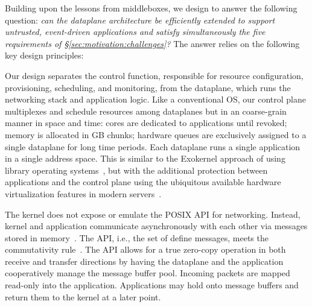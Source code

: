
Building upon the lessons from middleboxes, we design \ix to answer
the following question: {\it can the dataplane architecture be
  efficiently extended to support untrusted, event-driven applications
  and satisfy simultaneously the five requirements of
  \S\ref{sec:motivation:challenges}?}  The answer relies on the
following key design principles:


Our design separates the control function, responsible for resource
configuration, provisioning, scheduling, and monitoring, from the
dataplane, which runs the networking stack and application logic.
Like a conventional OS, our control plane multiplexes and schedule
resources among dataplanes but in an coarse-grain manner in space and
time: cores are dedicated to applications until revoked; memory is allocated in GB chunks; hardware
queues are exclusively assigned to a single dataplane for long time
periods. Each dataplane runs a single application in a single address
space.  This is similar to the Exokernel approach of using library
operating systems~\cite{DBLP:conf/sosp/EnglerKO95}, but with the
additional protection between applications and the control plane using
the ubiquitous available hardware virtualization features in modern
servers~\cite{DBLP:journals/computer/UhligNRSMABKLS05,belay2012dune}.


 The kernel does
not expose or emulate the POSIX API for networking.  Instead, kernel
and application communicate asynchronously with each other via
messages stored in memory~\cite{rizzo2012netmap,han2012megapipe}.  The
API, i.e., the set of define messages, meets the commutativity rule~\cite{DBLP:conf/sosp/ClementsKZMK13}.
The API allows for a true zero-copy
operation in both receive and transfer directions by having the
dataplane and the application cooperatively manage the message buffer
pool.  Incoming packets are mapped read-only into the
application. Applications may hold onto message buffers and return
them to the kernel at a later point.

